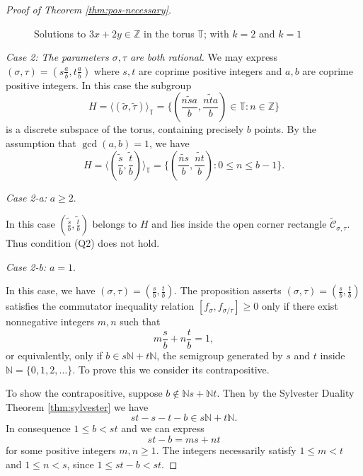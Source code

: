 \documentclass[11pt, letterpaper, reqno]{amsart}
\theoremstyle{definition}
\numberwithin{equation}{section}
\newcommand{\ZZ}{\ensuremath{\mathbb{Z}}}
\newcommand{\NN}{\mathbb{N}}
\newcommand{\TT}{\mathbb{T}}
\newcommand{\cCbar}{\widetilde{\mathcal{C}}}
\newcommand{\talpha}{{\sigma}}
\newcommand{\trho}{{\tau}}
\begin{document}
{\begin{proof}[Proof of Theorem \ref{thm:pos-necessary}]
\begin{figure}[h]
\begin{center}
\end{center}
\caption{Solutions to $3x+2y\in\ZZ$ in the torus $\TT$; with $k=2$ and $k=1$}
\label{fig:torus-neg-slope}
\end{figure} 

{\em Case 2:}
{\em The parameters $\talpha,\trho$ are both rational.}
We may express $(\talpha,\trho) = (s\frac{a}{b}, t\frac{a}{b})$ 
where $s,t$ are coprime positive integers and $a,b$ are coprime positive integers.
In this case the subgroup
$$H = \langle (\widetilde{\talpha},\widetilde{\trho})\rangle_{\TT} 
 = \{ (\widetilde{\frac{nsa}{b}}, \widetilde{\frac{nta}{b} }) \in \TT : n\in \ZZ \}$$
is a discrete subspace of the torus, containing precisely $b$ points. 
By the assumption that $\gcd(a, b) =1$, we have
$$H = \langle (\widetilde{\frac{s}{b}}, \widetilde{\frac{t}{b}})\rangle_{\TT} 
= \{ \left(\widetilde{ \frac{ns}{b}}, \widetilde{ \frac{nt}{b}}\right): 0 \le n \le b-1\}.$$ 

{\em Case 2-a:} $a \geq 2$. 

In this case   $ (\widetilde{\frac{s}{b}}, \widetilde{\frac{t}{b}})$ belongs to  $H$ 
and lies inside the open  corner rectangle $\cCbar_{\talpha,\trho}$.
 Thus condition (Q2) does not hold.

{\em Case 2-b:}   $a = 1$.

In this case,  we have  $(\talpha,\trho) = (\frac{s}{b}, \frac{t}{b})$.
The proposition asserts
$(\talpha,\trho) = (\frac{s}{b}, \frac{t}{b})$ 
satisfies the commutator inequality relation
$[f_\talpha, f_{\talpha/\trho}]\geq 0$ 
only if there exist nonnegative  integers $m,n$ such that
\[ m\frac{s}{b} + n\frac{t}{b} = 1,\]
or equivalently, only if $b \in s\NN + t\NN$, 
the semigroup generated by $s$ and $t$ inside $\NN = \{0, 1, 2, \ldots\}$.
To prove this  we consider its contrapositive. 

To show the contrapositive, suppose  $b \not\in \NN s + \NN t$. 
Then by the Sylvester Duality Theorem \ref{thm:sylvester} we have  
\[ st - s - t - b \in s\NN  + t\NN. \]
In consequence $1 \le b < st$ and we can express 
\[ st - b = ms + nt \]
for some  {positive} integers $m,n \geq 1$.
The integers necessarily satisfy $1 \le m < t$ and $1 \le n < s$, since $ 1\leq st-b < st.$


\end{proof}}
\end{document}
